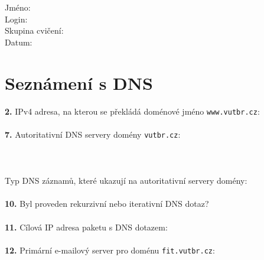 Jméno:\\
Login:\\
Skupina cvičení:\\
Datum:\\

\section{Seznámení s DNS}
\textbf{2.} IPv4 adresa, na kterou se překládá doménové jméno {\tt www.vutbr.cz}: \underline{\hspace{4.5cm}}
~\\
~\\
\textbf{7.} 
Autoritativní DNS servery domény \texttt{vutbr.cz}:
\\
\\
\\
\\
\hspace*{0.5cm}Typ DNS záznamů, které ukazují na autoritativní servery domény:
\underline{\hspace{2cm}}
~\\
~\\
\textbf{10.} Byl proveden rekurzivní nebo iterativní DNS dotaz?
\underline{\hspace{4cm}}
\\
\\
\textbf{11.} Cílová IP adresa paketu s DNS dotazem:
\underline{\hspace{4cm}}
\\
\\
\textbf{12.} Primární e-mailový server pro doménu \texttt{fit.vutbr.cz}:
\underline{\hspace{4cm}}

